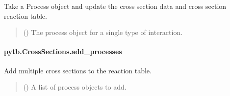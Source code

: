 \documentclass[letterpaper,10pt,english,openany,oneside]{sphinxmanual}
\begin{document}
\begin{fulllineitems}
\begin{fulllineitems}
\label{\detokenize{api/pytb.CrossSections.add_process:pytb.CrossSections.add_process}}
\pysigstartsignatures
{}
\pysigstopsignatures
\sphinxAtStartPar
Take a Process object and update the cross
section data and cross section reaction table.
\begin{quote}\begin{description}
\sphinxAtStartPar
{} ({\hyperref[\detokenize{api/pytb.Process:pytb.Process}]{}}) \textendash{} The process object for a single
type of interaction.

\end{description}\end{quote}

\end{fulllineitems}


\sphinxstepscope


\paragraph{pytb.CrossSections.add\_processes}
\label{\detokenize{api/pytb.CrossSections.add_processes:pytb-crosssections-add-processes}}\label{\detokenize{api/pytb.CrossSections.add_processes::doc}}

\begin{fulllineitems}
\label{\detokenize{api/pytb.CrossSections.add_processes:pytb.CrossSections.add_processes}}
\pysigstartsignatures
{}
\pysigstopsignatures
\sphinxAtStartPar
Add multiple cross sections to the reaction table.
\begin{quote}\begin{description}
\sphinxAtStartPar
{} (\sphinxstyleliteralemphasis{\sphinxupquote{{[}}}{\hyperref[\detokenize{api/pytb.Process:pytb.Process}]{\sphinxcrossref{\sphinxstyleliteralemphasis{\sphinxupquote{Process}}}}}\sphinxstyleliteralemphasis{\sphinxupquote{{]}}}) \textendash{} A list of process objects to add.


\end{description}
\end{quote}
\end{fulllineitems}
\end{fulllineitems}
\end{document}
